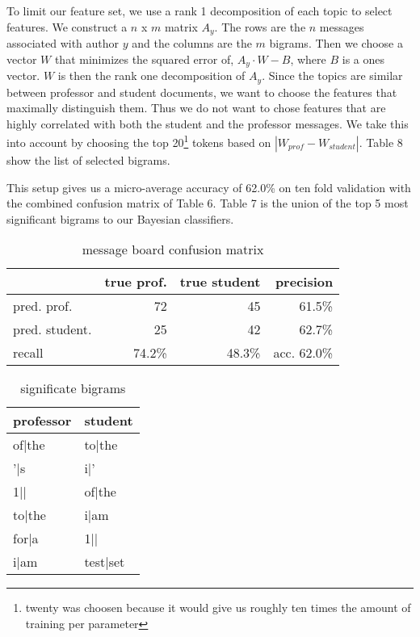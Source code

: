 \documentclass[fullpage]{article}
\begin{document}
To limit our feature set, we use a rank 1 decomposition of each topic to select features. We construct a $n$ x $m$ matrix $A_y$.  The rows are the $n$ messages associated with author $y$ and the columns are the $m$ bigrams.  Then we choose a vector $W$ that minimizes the squared error of, $A_y \cdot W - B$, where $B$ is a ones vector.  $W$ is then the rank one decomposition of $A_y$. Since the topics are similar between professor and student documents, we want to choose the features that maximally distinguish them. Thus we do not want to chose features that are highly correlated with both the student and the professor messages.  We take this into account by choosing the top 20\footnote{twenty was choosen because it would give us roughly ten times the amount of training per parameter} tokens based on $|W_{prof}-W_{student}|$. Table 8 show the list of selected bigrams.

This setup gives us a micro-average accuracy of 62.0\%  on ten fold validation with the combined confusion matrix of Table 6.  Table 7 is the union of the top 5 most significant bigrams to our Bayesian classifiers.

\begin{table}[h!]
\begin{center}
\begin{tabular} { l | r | r | r |}
	    &true prof.&true student&	precision \\
\hline
pred. prof.&	72&	     45	 	   &    61.5\%\\
pred. student.&	25&	     42	& 62.7\%\\
\hline
recall&	74.2\%	&48.3\%&	acc. 62.0\% \\
\end{tabular}
\caption{message board confusion matrix}
\end{center}
\end{table}

\begin{table}[h]
\begin{center}
\begin{tabular}{| l | l |}
professor & student  \\
\hline
 of|the  & to|the  \\
 '|s  &  i|' \\
 1|$|$  &  of|the \\
 to|the  & i|am  \\
 for|a  &  1|$|$ \\
 i|am  &  test|set \\
\end{tabular}
\caption{significate bigrams}
\end{center}
\end{table}
\end{document}
